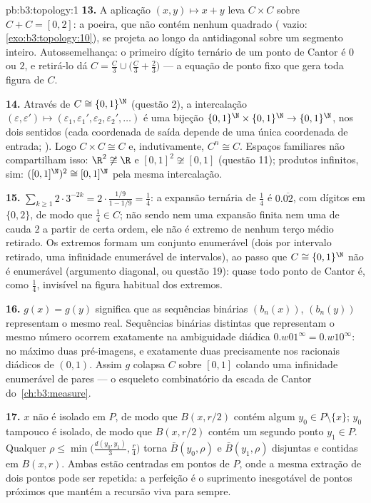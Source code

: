 \begin{solution}{pb:b3:topology:1}
\textbf{13.} A aplicação $(x, y) \mapsto x + y$ leva $C \times C$
sobre $C + C = [0,2]$: a poeira, que não contém nenhum quadrado
( vazio: \cref{exo:b3:topology:10}), se projeta ao longo
da antidiagonal sobre um segmento inteiro. Autossemelhança: o
primeiro dígito ternário de um ponto de Cantor é $0$ ou $2$, e
retirá-lo dá $C = \frac C3 \cup \bigl(\frac C3 +
\frac23\bigr)$ --- a equação de ponto fixo que gera
toda figura de $C$.

\textbf{14.} Através de $C \cong \{0,1\}^\N$ (questão 2), a
intercalação $(\varepsilon, \varepsilon') \mapsto
(\varepsilon_1, \varepsilon_1', \varepsilon_2,
\varepsilon_2', \dots)$ é uma bijeção
$\{0,1\}^\N\times\{0,1\}^\N \to \{0,1\}^\N$,  nos dois
sentidos (cada coordenada de saída depende de uma única coordenada
de entrada; ). Logo $C\times C \cong C$ e,
indutivamente, $C^n \cong C$. Espaços familiares não compartilham isso:
$\R^2 \not\cong \R$ e $[0,1]^2 \not\cong [0,1]$
(questão 11); produtos infinitos, sim: $([0,1]^\N)^2 \cong
[0,1]^\N$ pela mesma intercalação.

\textbf{15.} $\sum_{k\geq1}2\cdot3^{-2k} = 2\cdot\frac{1/9}{1
- 1/9} = \frac14$: a expansão ternária de $\frac14$ é
$0.\overline{02}$, com dígitos em $\{0,2\}$, de modo que $\frac14 \in
C$; não sendo nem uma expansão finita nem uma de cauda $2$
a partir de certa ordem, ele não é extremo de nenhum terço médio retirado. Os extremos
formam um conjunto enumerável (dois por intervalo retirado, uma infinidade enumerável de
intervalos), ao passo que $C \cong \{0,1\}^\N$ não é enumerável
(argumento diagonal, ou questão 19): quase todo ponto de Cantor
é, como $\frac14$, invisível na figura habitual dos extremos.

\textbf{16.} $g(x) = g(y)$ significa que as sequências binárias
$(b_n(x))$, $(b_n(y))$ representam o mesmo real. Sequências
binárias distintas que representam o mesmo número ocorrem exatamente na
ambiguidade diádica $0.w01^\infty = 0.w10^\infty$: no máximo
duas pré-imagens, e exatamente duas precisamente nos racionais
diádicos de $(0,1)$. Assim $g$ colapsa $C$ sobre $[0,1]$
colando uma infinidade enumerável de pares --- o esqueleto combinatório da
escada de Cantor do~\cref{ch:b3:measure}.

\textbf{17.} $x$ não é isolado em $P$, de modo que $B(x, r/2)$
contém algum $y_0 \in P \setminus \{x\}$; $y_0$ tampouco é
isolado, de modo que $B(x, r/2)$ contém um segundo ponto $y_1
\in P$. Qualquer $\rho \leq \min\bigl(\frac{d(y_0,y_1)}3,
\frac r4\bigr)$ torna $\bar B(y_0, \rho)$ e $\bar B(y_1,
\rho)$ disjuntas e contidas em $B(x, r)$. Ambas estão centradas
em pontos de $P$, onde a mesma extração de dois pontos pode ser
repetida: a perfeição é o suprimento inesgotável de pontos próximos
que mantém a recursão viva para sempre.


\end{solution}
